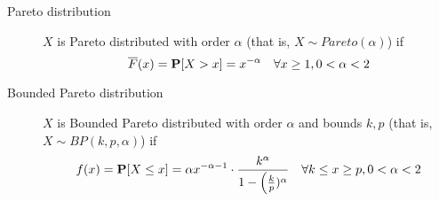 \begin{description}
	
	\item [Pareto distribution]
		$X$ is Pareto distributed with order $\alpha$ (that is, $X \sim Pareto(\alpha)$) if
		\begin{equation}
		\overline{F}(x) = \mathbf{P}[X > x] = x^{-\alpha} \quad \forall x \geq 1, 0 < \alpha < 2
		\end{equation}
	
	\item [Bounded Pareto distribution]
		$X$ is Bounded Pareto distributed with order $\alpha$ and bounds $k,p$ (that is, $X \sim BP(k,p,\alpha)$) if
		\begin{equation}
		f(x) = \mathbf{P}[X \leq x] = \alpha x^{-\alpha -1} \cdot \frac{k^{\alpha}}{1-\Big(\frac{k}{p})^{\alpha}} \quad \forall k \leq x \geq p, 0 < \alpha < 2
		\end{equation}
	
\end{description}